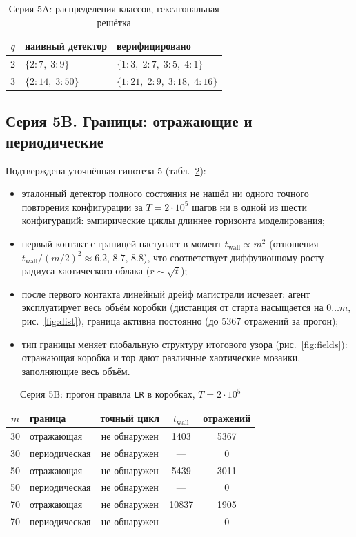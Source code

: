 \documentclass[12pt,a4paper]{article}
\begin{document}
	\begin{table}[H]
		\centering
		\caption{Серия 5A: распределения классов, гексагональная решётка}
		\label{tab:series5a}
		\begin{tabular}{cll}
			\toprule
			$q$ & наивный детектор & верифицировано \\
			\midrule
			2 & $\{2\!:7,\; 3\!:9\}$            & $\{1\!:3,\; 2\!:7,\; 3\!:5,\; 4\!:1\}$ \\
			3 & $\{2\!:14,\; 3\!:50\}$          & $\{1\!:21,\; 2\!:9,\; 3\!:18,\; 4\!:16\}$ \\
			\bottomrule
		\end{tabular}
	\end{table}
	
	\subsection{Серия 5B. Границы: отражающие и периодические}
	Подтверждена уточнённая гипотеза 5 (табл.~\ref{tab:series5b}):
	\begin{itemize}
		\item эталонный детектор полного состояния не нашёл ни одного точного повторения конфигурации за $T=2\cdot10^5$ шагов ни в одной из шести конфигураций: эмпирические циклы длиннее горизонта моделирования;
		\item первый контакт с границей наступает в момент $t_{\mathrm{wall}}\propto m^2$ (отношения $t_{\mathrm{wall}}/(m/2)^2 \approx 6.2,\,8.7,\,8.8$), что соответствует диффузионному росту радиуса хаотического облака
		($r\sim\sqrt t$);
		\item после первого контакта линейный дрейф магистрали исчезает: агент эксплуатирует весь объём коробки (дистанция от старта насыщается на $0\dots m$, рис.~\ref{fig:dist}), граница активна постоянно (до 5367 отражений за прогон);
		\item тип границы меняет глобальную структуру итогового узора (рис.~\ref{fig:fields}): отражающая коробка и тор дают различные хаотические мозаики, заполняющие весь объём.
	\end{itemize}
	
	\begin{table}[H]
		\centering
		\caption{Серия 5B: прогон правила \texttt{LR} в коробках, $T=2\cdot10^5$}
		\label{tab:series5b}
		\begin{tabular}{clccc}
			\toprule
			$m$ & граница & точный цикл & $t_{\mathrm{wall}}$ & отражений \\
			\midrule
			30 & отражающая   & не обнаружен & 1403  & 5367 \\
			30 & периодическая& не обнаружен & ---   & 0 \\
			50 & отражающая   & не обнаружен & 5439  & 3011 \\
			50 & периодическая& не обнаружен & ---   & 0 \\
			70 & отражающая   & не обнаружен & 10837 & 1905 \\
			70 & периодическая& не обнаружен & ---   & 0 \\
			\bottomrule
		\end{tabular}
	\end{table}
	
\end{document}
